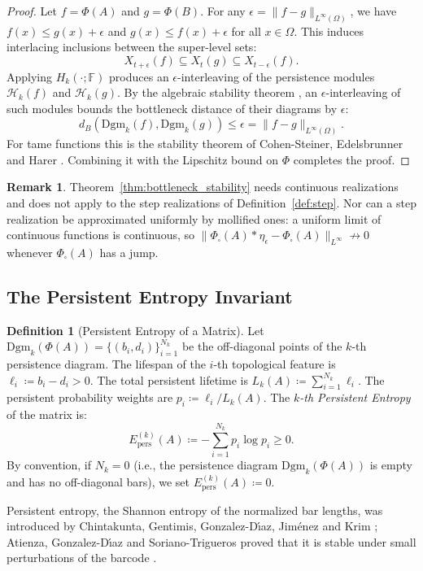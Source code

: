 \documentclass[11pt,a4paper,reqno]{amsart}
\theoremstyle{definition}
\newtheorem{definition}[theorem]{Definition}
\newtheorem{remark}[theorem]{Remark}
\numberwithin{equation}{section}
\begin{document}
\begin{proof}
Let $f = \Phi(A)$ and $g = \Phi(B)$. For any $\epsilon = \|f - g\|_{L^\infty(\Omega)}$, we have $f(x) \le g(x) + \epsilon$ and $g(x) \le f(x) + \epsilon$ for all $x \in \Omega$. 
This induces interlacing inclusions between the super-level sets:
\begin{equation}
    X_{t+\epsilon}(f) \subseteq X_t(g) \subseteq X_{t-\epsilon}(f).
\end{equation}
Applying $H_k(\cdot; \mathbb{F})$ produces an $\epsilon$-interleaving of the persistence modules $\mathcal{H}_k(f)$ and $\mathcal{H}_k(g)$. By the algebraic stability theorem \cite{chazal2009proximity,chazal2016structure}, an $\epsilon$-interleaving of such modules bounds the bottleneck distance of their diagrams by $\epsilon$:
\begin{equation}
    d_B(\mathrm{Dgm}_k(f), \mathrm{Dgm}_k(g)) \le \epsilon = \|f - g\|_{L^\infty(\Omega)}.
\end{equation}
For tame functions this is the stability theorem of Cohen-Steiner, Edelsbrunner and Harer \cite{cohensteiner2007stability}. Combining it with the Lipschitz bound on $\Phi$ completes the proof.
\end{proof}

\begin{remark}
Theorem~\ref{thm:bottleneck_stability} needs continuous realizations and does not apply to the step realizations of Definition~\ref{def:step}. Nor can a step realization be approximated uniformly by mollified ones: a uniform limit of continuous functions is continuous, so $\|\Phi_\square(A) * \eta_\epsilon - \Phi_\square(A)\|_{L^\infty} \not\to 0$ whenever $\Phi_\square(A)$ has a jump.
\end{remark}

\subsection{The Persistent Entropy Invariant}
\begin{definition}[Persistent Entropy of a Matrix]
Let $\mathrm{Dgm}_k(\Phi(A)) = \{(b_i, d_i)\}_{i=1}^{N_k}$ be the off-diagonal points of the $k$-th persistence diagram. The lifespan of the $i$-th topological feature is $\ell_i \coloneqq b_i - d_i > 0$. The total persistent lifetime is $L_k(A) \coloneqq \sum_{i=1}^{N_k} \ell_i$. The persistent probability weights are $p_i \coloneqq \ell_i / L_k(A)$.
The \emph{$k$-th Persistent Entropy} of the matrix is:
\begin{equation}
    E_{\mathrm{pers}}^{(k)}(A) \coloneqq -\sum_{i=1}^{N_k} p_i \log p_i \ge 0.
\end{equation}
By convention, if $N_k = 0$ (i.e., the persistence diagram $\mathrm{Dgm}_k(\Phi(A))$ is empty and has no off-diagonal bars), we set $E_{\mathrm{pers}}^{(k)}(A) \coloneqq 0$.
\end{definition}
Persistent entropy, the Shannon entropy of the normalized bar lengths, was introduced by Chintakunta, Gentimis, Gonzalez-D{\'\i}az, Jim{\'e}nez and Krim \cite{chintakunta2015entropy}; Atienza, Gonzalez-D{\'\i}az and Soriano-Trigueros proved that it is stable under small perturbations of the barcode \cite{atienza2020stability}.
\end{document}
